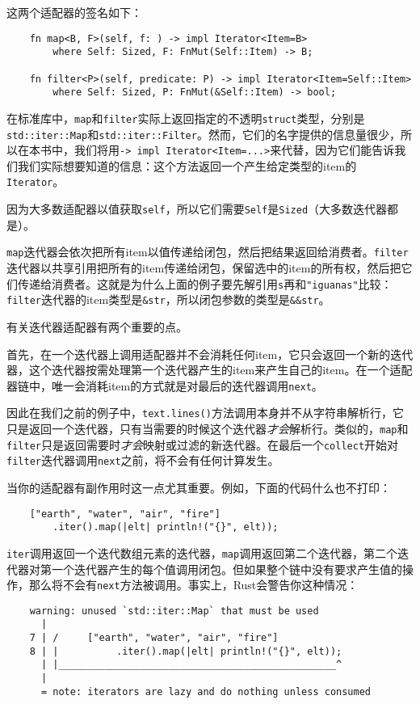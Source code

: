 这两个适配器的签名如下：
\begin{verbatim}
    fn map<B, F>(self, f: ) -> impl Iterator<Item=B>
        where Self: Sized, F: FnMut(Self::Item) -> B;

    fn filter<P>(self, predicate: P) -> impl Iterator<Item=Self::Item>
        where Self: Sized, P: FnMut(&Self::Item) -> bool;
\end{verbatim}

在标准库中，\texttt{map}和\texttt{filter}实际上返回指定的不透明\texttt{struct}类型，分别是\texttt{std::iter::Map}和\texttt{std::iter::Filter}。然而，它们的名字提供的信息量很少，所以在本书中，我们将用\texttt{-> impl Iterator<Item=...>}来代替，因为它们能告诉我们我们实际想要知道的信息：这个方法返回一个产生给定类型的item的\texttt{Iterator}。

因为大多数适配器以值获取\texttt{self}，所以它们需要\texttt{Self}是\texttt{Sized}（大多数迭代器都是）。

\texttt{map}迭代器会依次把所有item以值传递给闭包，然后把结果返回给消费者。\texttt{filter}迭代器以共享引用把所有的item传递给闭包，保留选中的item的所有权，然后把它们传递给消费者。这就是为什么上面的例子要先解引用\texttt{s}再和\texttt{"iguanas"}比较：\texttt{filter}迭代器的item类型是\texttt{\&str}，所以闭包参数的类型是\texttt{\&\&str}。

有关迭代器适配器有两个重要的点。

首先，在一个迭代器上调用适配器并不会消耗任何item，它只会返回一个新的迭代器，这个迭代器按需处理第一个迭代器产生的item来产生自己的item。在一个适配器链中，唯一会消耗item的方式就是对最后的迭代器调用\texttt{next}。

因此在我们之前的例子中，\texttt{text.lines()}方法调用本身并不从字符串解析行，它只是返回一个迭代器，只有当需要的时候这个迭代器\emph{才会}解析行。类似的，\texttt{map}和\texttt{filter}只是返回需要时\emph{才会}映射或过滤的新迭代器。在最后一个\texttt{collect}开始对\texttt{filter}迭代器调用\texttt{next}之前，将不会有任何计算发生。

当你的适配器有副作用时这一点尤其重要。例如，下面的代码什么也不打印：
\begin{verbatim}
    ["earth", "water", "air", "fire"]
        .iter().map(|elt| println!("{}", elt));
\end{verbatim}

\texttt{iter}调用返回一个迭代数组元素的迭代器，\texttt{map}调用返回第二个迭代器，第二个迭代器对第一个迭代器产生的每个值调用闭包。但如果整个链中没有要求产生值的操作，那么将不会有\texttt{next}方法被调用。事实上，Rust会警告你这种情况：
\begin{verbatim}
    warning: unused `std::iter::Map` that must be used
      |
    7 | /     ["earth", "water", "air", "fire"]
    8 | |          .iter().map(|elt| println!("{}", elt));
      | |________________________________________________^
      |
      = note: iterators are lazy and do nothing unless consumed
\end{verbatim}

